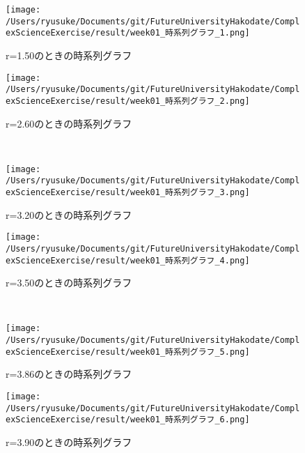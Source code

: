 \documentclass[dvipdfmx,uplatex]{jsarticle}
\begin{document}
\begin{figure}[htbp]
 \begin{minipage}{0.5\hsize}
  \begin{center}
   \texttt{[image: /Users/ryusuke/Documents/git/FutureUniversityHakodate/ComplexScienceExercise/result/week01\_時系列グラフ\_1.png]}
  \end{center}
  \caption{r=1.50のときの時系列グラフ}
  \label{fig:one}
 \end{minipage}
 \begin{minipage}{0.5\hsize}
  \begin{center}
   \texttt{[image: /Users/ryusuke/Documents/git/FutureUniversityHakodate/ComplexScienceExercise/result/week01\_時系列グラフ\_2.png]}
  \end{center}
  \caption{r=2.60のときの時系列グラフ}
  \label{fig:two}
 \end{minipage} \\
 \begin{minipage}{0.5\hsize}
  \begin{center}
   \texttt{[image: /Users/ryusuke/Documents/git/FutureUniversityHakodate/ComplexScienceExercise/result/week01\_時系列グラフ\_3.png]}
  \end{center}
  \caption{r=3.20のときの時系列グラフ}
  \label{fig:three}
 \end{minipage}
 \begin{minipage}{0.5\hsize}
  \begin{center}
   \texttt{[image: /Users/ryusuke/Documents/git/FutureUniversityHakodate/ComplexScienceExercise/result/week01\_時系列グラフ\_4.png]}
  \end{center}
  \caption{r=3.50のときの時系列グラフ}
  \label{fig:four}
 \end{minipage} \\
 \begin{minipage}{0.5\hsize}
  \begin{center}
   \texttt{[image: /Users/ryusuke/Documents/git/FutureUniversityHakodate/ComplexScienceExercise/result/week01\_時系列グラフ\_5.png]}
  \end{center}
  \caption{r=3.86のときの時系列グラフ}
  \label{fig:five}
 \end{minipage}
 \begin{minipage}{0.5\hsize}
  \begin{center}
   \texttt{[image: /Users/ryusuke/Documents/git/FutureUniversityHakodate/ComplexScienceExercise/result/week01\_時系列グラフ\_6.png]}
  \end{center}
  \caption{r=3.90のときの時系列グラフ}
  \label{fig:six}
 \end{minipage}
\end{figure}
\end{document}
